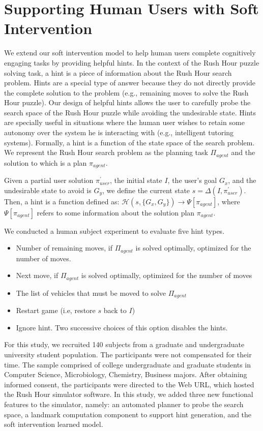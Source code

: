 \section*{Supporting Human Users with Soft Intervention}
We extend our soft intervention model to help human users complete cognitively engaging tasks by providing helpful hints. In the context of the Rush Hour puzzle solving task, a hint is a piece of information about the Rush Hour search problem. Hints are a special type of answer because they do not directly provide the complete solution to the problem (e.g., remaining moves to solve the Rush Hour puzzle). Our design of helpful hints allows the user to carefully probe the search space of the Rush Hour puzzle while avoiding the undesirable state. Hints are specially useful in situations where the human user wishes to retain some autonomy over the system he is interacting with (e.g., intelligent tutoring systems).
Formally, a hint is a function of the state space of the search problem. We represent the Rush Hour search problem as the planning task $\Pi_{agent}$ and the solution to which is a plan $\pi_{agent}$.
\begin{definition}
Given a partial user solution $\pi^\prime _{user}$, the initial state $I$, the user's goal $G_x$, and the undesirable state to avoid is $G_y$, we define the current state $s = \Delta (I,\pi^\prime _{user})$. Then, a hint is a function defined as: $\mathcal{H}(s,\lbrace G_x,G_y\rbrace) \rightarrow \Psi[\pi_{agent}]$, where $\Psi[\pi_{agent}]$ refers to some information about the solution plan $\pi_{agent}$.
\end{definition}
We conducted a human subject experiment to evaluate five hint types.
\begin{itemize}
\item Number of remaining moves, if $\Pi_{agent}$ is solved optimally, optimized for the number of moves.
\item Next move, if $\Pi_{agent}$ is solved optimally, optimized for the number of moves
\item The list of vehicles that must be moved to solve $\Pi_{agent}$
\item Restart game (i.e, restore $s$ back to $I$)
\item Ignore hint. Two successive choices of this option disables the hints.
\end{itemize}

For this study, we recruited 140 subjects from a graduate and undergraduate university student population. The participants were not compensated for their time. The sample comprised of college undergraduate and graduate students in Computer Science, Microbiology, Chemistry, Business majors. After obtaining informed consent, the participants were directed to the Web URL, which hosted the Rush Hour simulator software. In this study, we added three new functional features to the simulator, namely: an automated planner to probe the search space, a landmark computation component to support hint generation, and the soft intervention learned model.

